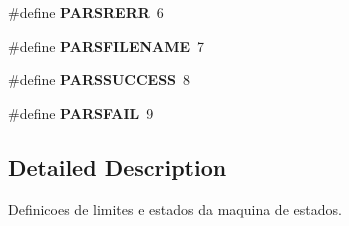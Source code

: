 \begin{DoxyCompactItemize}
\item 
\hypertarget{group__Parser_gad6de3fb3d3d7c3e61c47064485d6ddba}{
\#define {\bfseries PARSRERR}~6}
\label{group__Parser_gad6de3fb3d3d7c3e61c47064485d6ddba}

\item 
\hypertarget{group__Parser_gade5152228b1526d37041c20599c0cb40}{
\#define {\bfseries PARSFILENAME}~7}
\label{group__Parser_gade5152228b1526d37041c20599c0cb40}

\item 
\hypertarget{group__Parser_gaee825fabc692bad2695ee8a043242aaa}{
\#define {\bfseries PARSSUCCESS}~8}
\label{group__Parser_gaee825fabc692bad2695ee8a043242aaa}

\item 
\hypertarget{group__Parser_ga76b1437f9ec6b163feef2b3a74d729c1}{
\#define {\bfseries PARSFAIL}~9}
\label{group__Parser_ga76b1437f9ec6b163feef2b3a74d729c1}

\end{DoxyCompactItemize}


\subsection{Detailed Description}
Definicoes de limites e estados da maquina de estados. 